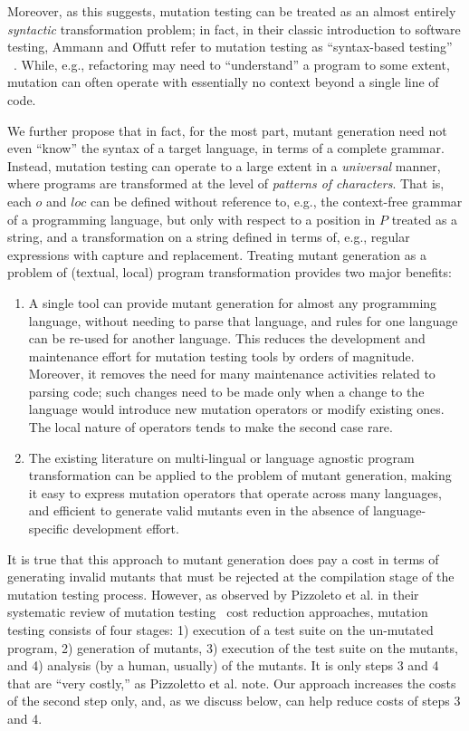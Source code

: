 \documentclass[acmsmall,screen,review,anonymous]{acmart}
\begin{document}
Moreover, as this suggests,
mutation testing can be treated as an almost entirely \emph{syntactic}
transformation problem; in fact, in their classic introduction to
software testing, Ammann and Offutt refer to mutation testing as
``syntax-based testing'' ~\cite{ammann2016introduction}.  While, e.g., refactoring may need to
``understand'' a program to some extent, mutation can often operate
with essentially no context beyond a single line of code.

We further propose that in fact, for the most part, mutant
generation need not even ``know'' the syntax of a target language, in
terms of a complete grammar.  Instead, mutation testing can operate to
a large extent in a \emph{universal} manner, where programs are
transformed at the level of \emph{patterns of characters}.  That is,
each $o$ and $loc$ can be defined without reference to, e.g., the
context-free grammar of a programming language, but only with respect
to a position in $P$ treated as a string, and a transformation on a
string defined in terms of, e.g., regular expressions with capture and
replacement.  Treating mutant generation as a problem of (textual, local)
program transformation provides two major benefits:

\begin{enumerate}
  \item A single tool can provide mutant generation for almost any
    programming language, without needing to parse that language, and
    rules for one language can be re-used for another language.  This
    reduces the development and maintenance effort for mutation
    testing tools by orders of magnitude.  Moreover, it removes the
    need for many   maintenance activities related to parsing code;
    such changes need to be made only when a change to the language
    would introduce new mutation operators or modify existing ones.
    The local nature of operators tends to make the second case rare.
    \item The existing literature on multi-lingual or language
      agnostic program transformation can be applied to the problem of
      mutant generation, making it easy to express mutation operators
      that operate across many languages, and efficient to generate
      valid mutants even in the absence of language-specific
      development effort.
      \end{enumerate}

It is true that this approach to mutant generation does pay a cost in
terms of generating invalid mutants that must be rejected at the
compilation stage of the mutation testing process.  However, as
observed by Pizzoleto et al. in their systematic review of mutation
testing~\cite{pizzoleto2019systematic} cost reduction approaches, mutation testing consists of four
stages: 1) execution of a test suite on the un-mutated program, 2)
generation of mutants, 3) execution of the test suite on the mutants,
and 4) analysis (by a human, usually) of the mutants.  It is only steps 3
and 4 that are ``very costly,'' as Pizzoletto et al. note.  Our approach increases the costs of
the second step only, and, as we discuss below, can help reduce
costs of steps 3 and 4.
      
\end{document}
